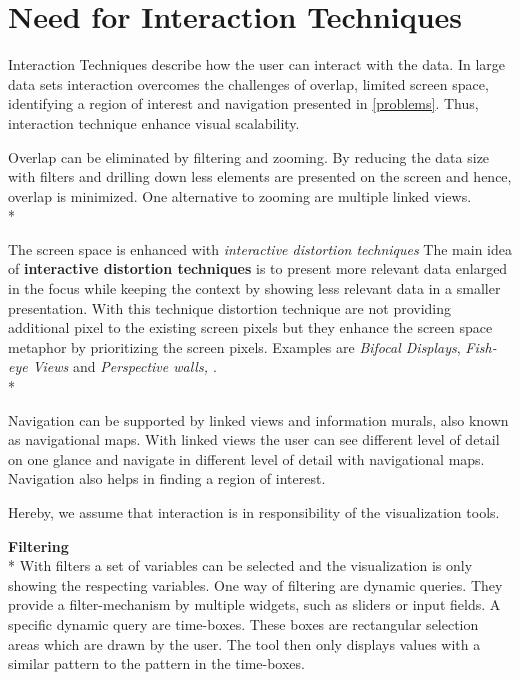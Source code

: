 \section{Need for Interaction Techniques}
Interaction Techniques describe how the user can interact with the data. In large data sets interaction overcomes the challenges of overlap, limited screen space, identifying a region of interest and navigation presented in \ref{problems}. Thus, interaction technique enhance visual scalability\cite{Tegarden1999}.

Overlap can be eliminated by filtering and zooming. By reducing the data size with filters and drilling down less elements are presented on the screen and hence, overlap is minimized. One alternative to zooming are multiple linked views.\\*

The screen space is enhanced with \textit{interactive distortion techniques}\cite{mackinlay1991perspective}
The main idea of \textbf{interactive distortion techniques} is to present more relevant data enlarged in the focus while keeping the context by showing less relevant data in a smaller presentation. With this technique distortion technique are not  providing additional pixel to the existing screen pixels but they enhance the screen space metaphor by prioritizing the screen pixels.
Examples are \textit{Bifocal Displays}\cite{Spence1982}, \textit{Fish-eye Views} and \textit{Perspective walls\cite{Keim2005}, \cite{mackinlay1991perspective}}.\\*

Navigation can be supported by linked views and information murals, also known as navigational maps\cite{Jerding1998}. With linked views the user can see different level of detail on one glance and navigate in different level of detail with navigational maps. Navigation also helps in finding a region of interest.

Hereby, we assume that interaction is in responsibility of the visualization tools.

\textbf{Filtering}\\*
With filters a set of variables can be selected and the visualization is only showing the respecting variables.
One way of filtering are dynamic queries. They provide a filter-mechanism by multiple widgets, such as sliders or input fields\cite{Hochheiser2004,Shneiderman2008,Aigner2011}. A specific dynamic query are time-boxes. These boxes are rectangular selection areas which are drawn by the user. The tool then only displays values with a similar pattern to the pattern in the time-boxes.

